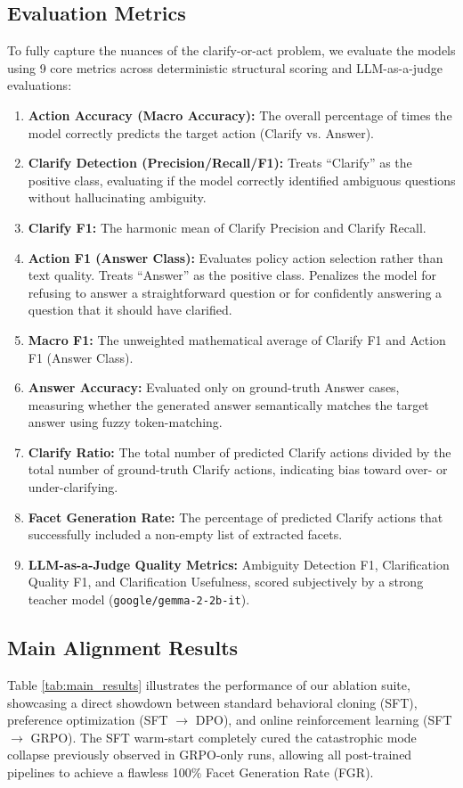 \documentclass{article}
\theoremstyle{plain}
\theoremstyle{definition}
\theoremstyle{remark}
\begin{document}
\subsection{Evaluation Metrics}
To fully capture the nuances of the clarify-or-act problem, we evaluate the models using 9 core metrics across deterministic structural scoring and LLM-as-a-judge evaluations:
\begin{enumerate}
\item \textbf{Action Accuracy (Macro Accuracy):} The overall percentage of times the model correctly predicts the target action (Clarify vs. Answer).
\item \textbf{Clarify Detection (Precision/Recall/F1):} Treats ``Clarify'' as the positive class, evaluating if the model correctly identified ambiguous questions without hallucinating ambiguity.
\item \textbf{Clarify F1:} The harmonic mean of Clarify Precision and Clarify Recall.
\item \textbf{Action F1 (Answer Class):} Evaluates policy action selection rather than text quality. Treats ``Answer'' as the positive class. Penalizes the model for refusing to answer a straightforward question or for confidently answering a question that it should have clarified.
\item \textbf{Macro F1:} The unweighted mathematical average of Clarify F1 and Action F1 (Answer Class).
\item \textbf{Answer Accuracy:} Evaluated only on ground-truth Answer cases, measuring whether the generated answer semantically matches the target answer using fuzzy token-matching.
\item \textbf{Clarify Ratio:} The total number of predicted Clarify actions divided by the total number of ground-truth Clarify actions, indicating bias toward over- or under-clarifying.
\item \textbf{Facet Generation Rate:} The percentage of predicted Clarify actions that successfully included a non-empty list of extracted facets.
\item \textbf{LLM-as-a-Judge Quality Metrics:} Ambiguity Detection F1, Clarification Quality F1, and Clarification Usefulness, scored subjectively by a strong teacher model (\texttt{google/gemma-2-2b-it}).
\end{enumerate}

\subsection{Main Alignment Results}
Table \ref{tab:main_results} illustrates the performance of our ablation suite, showcasing a direct showdown between standard behavioral cloning (SFT), preference optimization (SFT $\rightarrow$ DPO), and online reinforcement learning (SFT $\rightarrow$ GRPO). The SFT warm-start completely cured the catastrophic mode collapse previously observed in GRPO-only runs, allowing all post-trained pipelines to achieve a flawless 100\% Facet Generation Rate (FGR).
\end{document}
